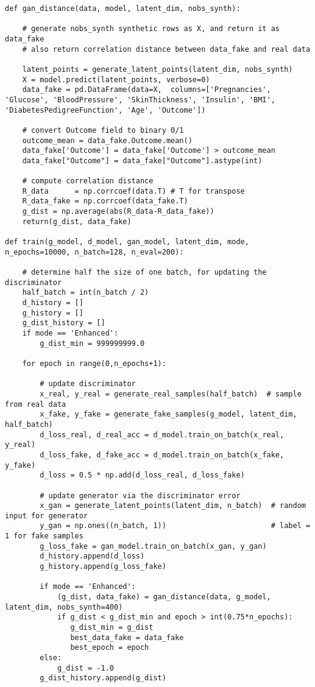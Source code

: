 \documentclass[oneside,10pt]{book}
\begin{document}
\begin{lstlisting}
def gan_distance(data, model, latent_dim, nobs_synth):

    # generate nobs_synth synthetic rows as X, and return it as data_fake
    # also return correlation distance between data_fake and real data

    latent_points = generate_latent_points(latent_dim, nobs_synth)
    X = model.predict(latent_points, verbose=0)
    data_fake = pd.DataFrame(data=X,  columns=['Pregnancies', 'Glucose', 'BloodPressure', 'SkinThickness', 'Insulin', 'BMI', 'DiabetesPedigreeFunction', 'Age', 'Outcome'])

    # convert Outcome field to binary 0/1
    outcome_mean = data_fake.Outcome.mean()
    data_fake['Outcome'] = data_fake['Outcome'] > outcome_mean
    data_fake["Outcome"] = data_fake["Outcome"].astype(int)

    # compute correlation distance
    R_data      = np.corrcoef(data.T) # T for transpose
    R_data_fake = np.corrcoef(data_fake.T)
    g_dist = np.average(abs(R_data-R_data_fake))
    return(g_dist, data_fake)

def train(g_model, d_model, gan_model, latent_dim, mode, n_epochs=10000, n_batch=128, n_eval=200):

    # determine half the size of one batch, for updating the  discriminator
    half_batch = int(n_batch / 2)
    d_history = []
    g_history = []
    g_dist_history = []
    if mode == 'Enhanced':
        g_dist_min = 999999999.0

    for epoch in range(0,n_epochs+1):

        # update discriminator
        x_real, y_real = generate_real_samples(half_batch)  # sample from real data
        x_fake, y_fake = generate_fake_samples(g_model, latent_dim, half_batch)
        d_loss_real, d_real_acc = d_model.train_on_batch(x_real, y_real)
        d_loss_fake, d_fake_acc = d_model.train_on_batch(x_fake, y_fake)
        d_loss = 0.5 * np.add(d_loss_real, d_loss_fake)

        # update generator via the discriminator error
        x_gan = generate_latent_points(latent_dim, n_batch)  # random input for generator
        y_gan = np.ones((n_batch, 1))                        # label = 1 for fake samples
        g_loss_fake = gan_model.train_on_batch(x_gan, y_gan)
        d_history.append(d_loss)
        g_history.append(g_loss_fake)

        if mode == 'Enhanced':
            (g_dist, data_fake) = gan_distance(data, g_model, latent_dim, nobs_synth=400)
            if g_dist < g_dist_min and epoch > int(0.75*n_epochs):
               g_dist_min = g_dist
               best_data_fake = data_fake
               best_epoch = epoch
        else:
            g_dist = -1.0
        g_dist_history.append(g_dist)


\end{lstlisting}
\end{document}

